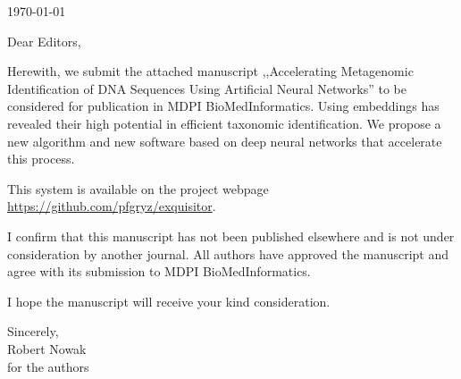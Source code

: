 \documentclass[12pt]{article}
\begin{document}
\pagestyle{empty}

\begin{flushright}
\today
\end{flushright}

\noindent
Dear Editors,

\vspace{5mm}

Herewith, we submit the attached manuscript ,,Accelerating Metagenomic Identification of DNA Sequences Using Artificial Neural Networks'' to be considered for publication in MDPI BioMedInformatics. Using embeddings has revealed their high potential in efficient taxonomic identification. We propose a new algorithm and new software based on deep neural networks that accelerate this process.

This system is available on the project webpage \url{https://github.com/pfgryz/exquisitor}.

I confirm that this manuscript has not been published elsewhere and is not under consideration by another journal. All authors have approved the manuscript and agree with its submission to MDPI BioMedInformatics.

I hope the manuscript will receive your kind consideration.

\vspace{5mm}
\noindent
Sincerely,\\
Robert Nowak\\
for the authors
\end{document}
